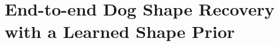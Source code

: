 \chapter{End-to-end Dog Shape Recovery with a Learned Shape Prior}\label{chap:wldo}

\ifpdf
    \graphicspath{{Chapter5/Figs/Raster/}{Chapter5/Figs/PDF/}{Chapter5/Figs/}}
\else
    \graphicspath{{Chapter5/Figs/Vector/}{Chapter5/Figs/}}
\fi














